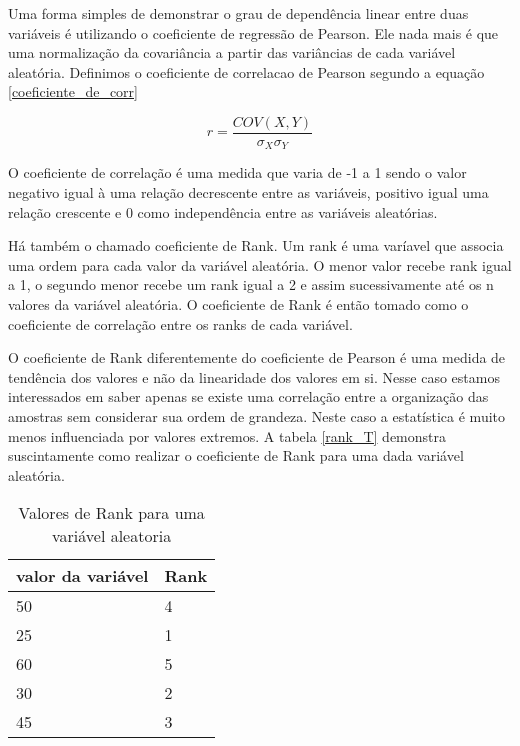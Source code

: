 Uma forma simples de demonstrar o grau de dependência linear entre duas variáveis é utilizando o coeficiente de regressão de Pearson. Ele nada mais é que uma normalização da covariância a partir das variâncias de cada variável aleatória. Definimos o coeficiente de correlacao de Pearson segundo a equação \eqref{coeficiente_de_corr}

  \begin{equation}\label{coeficiente_de_corr}
  r = \frac{COV(X,Y)}{\sigma _{X}\sigma _{Y}}
  \end{equation}
  
 O coeficiente de correlação é uma medida que varia de -1 a 1 sendo o valor negativo igual à uma relação decrescente entre as variáveis, positivo igual uma relação crescente e 0 como independência entre as variáveis aleatórias. 
 
 Há também o chamado coeficiente de Rank. Um rank é uma varíavel que associa uma ordem para cada valor da variável aleatória. O menor valor recebe rank igual a 1, o segundo menor recebe um rank igual a 2 e assim sucessivamente até os n valores da variável aleatória. O coeficiente de Rank é então tomado como o coeficiente de correlação entre os ranks de cada variável. 
 
 O coeficiente de Rank diferentemente do coeficiente de Pearson é uma medida de tendência dos valores e não da linearidade dos valores em si. Nesse caso estamos interessados em saber apenas se existe uma correlação entre a organização das amostras sem considerar sua ordem de grandeza. Neste caso a estatística é muito menos influenciada por valores extremos. A tabela \eqref{rank_T} demonstra suscintamente como realizar o coeficiente de Rank para uma dada variável aleatória. 
 

\begin{table}[H]
	\centering
	\caption{Valores de Rank para uma variável aleatoria}
	\label{rank_T}
	\begin{tabular}{@{}ll@{}}
		\toprule
		valor da variável & Rank \\ \midrule
		50                & 4    \\
		25                & 1    \\
		60                & 5    \\
		30                & 2    \\
		45                & 3    \\ \bottomrule
	\end{tabular}
\end{table}
 
